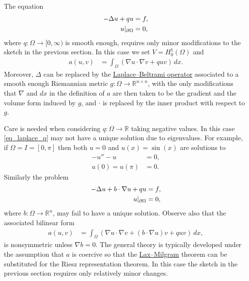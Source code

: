 \documentclass[12pt,oneside,final]{amsart}
\def\p{\partial}
\def\R{\mathbb R}
\begin{document}
The equation 
    \begin{align}\label{eq_laplace_q}
- \Delta u + q u &= f, 
\\\notag
u|_{\p \Omega} &= 0,
    \end{align} 
where $q : \Omega \to [0,\infty)$ is smooth enough,
requires only minor modifications to the sketch in the previous section. 
In this case we set $V = H^1_0(\Omega)$ and 
    \begin{align*}
a(u,v) &= \int_\Omega (\nabla u \cdot \nabla v + q u v)\, dx.
    \end{align*}
Moreover, $\Delta$ can be replaced by the \href{https://en.wikipedia.org/wiki/Laplace%E2%80%93Beltrami_operator}{Laplace--Beltrami operator} associated to a smooth enough Riemannian metric $g : \Omega \to \R^{n \times n}$,
with the only modifications that $\nabla$ and $dx$ in the definition of $a$ are then taken to be the gradient and the volume form induced by $g$, and $\cdot$ is replaced by the inner product with respect to $g$.

Care is needed when considering $q : \Omega \to \R$ taking negative values. In this case \eqref{eq_laplace_q} may not have a unique solution due to eigenvalues. For example, if $\Omega = I = [0, \pi]$ then
both $u = 0$ and $u(x) = \sin(x)$ are solutions to 
    \begin{align*}
-u'' - u &= 0,
\\
u(0) = u(\pi) &= 0.
    \end{align*}
Similarly the problem 
    \begin{align*}
- \Delta u + b\cdot\nabla u + q u &= f, 
\\\notag
u|_{\p \Omega} &= 0,
    \end{align*} 
where $b : \Omega \to \R^n$, 
may fail to have a unique solution. Observe also that the associated bilinear form
    \begin{align*}
a(u,v) &= \int_\Omega (\nabla u \cdot \nabla v + (b \cdot \nabla u) v+ q u v)\, dx,
    \end{align*} 
is nonsymmetric unless $\nabla b = 0$. The general theory is typically developed under the assumption that $a$ is coercive so that the \href{https://en.wikipedia.org/wiki/Weak_formulation#The_Lax%E2%80%93Milgram_theorem}{Lax--Milgram} theorem can be substituted for the Riesz representation theorem. In this case the sketch in the previous section requires only relatively minor changes. 
\end{document}

